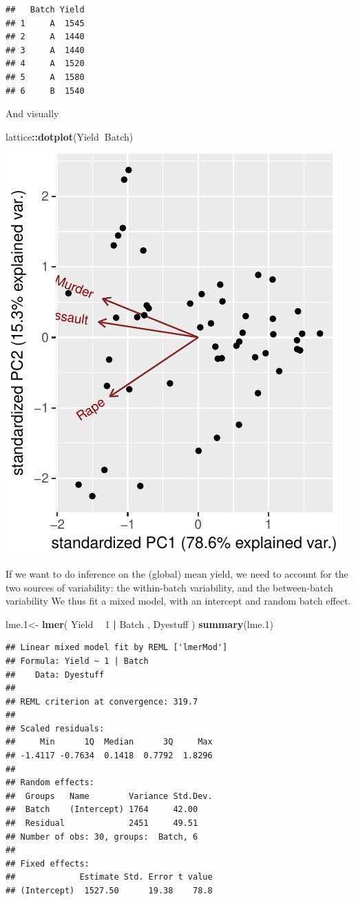 \documentclass[]{book}
\newenvironment{Shaded}{\begin{snugshade}}{\end{snugshade}}
\newcommand{\KeywordTok}[1]{\textcolor[rgb]{0.13,0.29,0.53}{\textbf{#1}}}
\newcommand{\DecValTok}[1]{\textcolor[rgb]{0.00,0.00,0.81}{#1}}
\newcommand{\StringTok}[1]{\textcolor[rgb]{0.31,0.60,0.02}{#1}}
\newcommand{\OperatorTok}[1]{\textcolor[rgb]{0.81,0.36,0.00}{\textbf{#1}}}
\newcommand{\NormalTok}[1]{#1}
\theoremstyle{definition}
\theoremstyle{definition}
\theoremstyle{definition}
\theoremstyle{remark}
\begin{document}
\begin{verbatim}
##   Batch Yield
## 1     A  1545
## 2     A  1440
## 3     A  1440
## 4     A  1520
## 5     A  1580
## 6     B  1540
\end{verbatim}

And visually

\begin{Shaded}
\begin{Highlighting}[]
\NormalTok{lattice}\OperatorTok{::}\KeywordTok{dotplot}\NormalTok{(Yield}\OperatorTok{~}\NormalTok{Batch)}
\end{Highlighting}
\end{Shaded}

\includegraphics[width=0.5\linewidth]{Rcourse_files/figure-latex/unnamed-chunk-199-1}

If we want to do inference on the (global) mean yield, we need to
account for the two sources of variability: the within-batch
variability, and the between-batch variability We thus fit a mixed
model, with an intercept and random batch effect.

\begin{Shaded}
\begin{Highlighting}[]
\NormalTok{lme.}\DecValTok{1}\NormalTok{<-}\StringTok{ }\KeywordTok{lmer}\NormalTok{( Yield }\OperatorTok{~}\StringTok{ }\DecValTok{1}  \OperatorTok{|}\StringTok{ }\NormalTok{Batch  , Dyestuff )}
\KeywordTok{summary}\NormalTok{(lme.}\DecValTok{1}\NormalTok{)}
\end{Highlighting}
\end{Shaded}

\begin{verbatim}
## Linear mixed model fit by REML ['lmerMod']
## Formula: Yield ~ 1 | Batch
##    Data: Dyestuff
## 
## REML criterion at convergence: 319.7
## 
## Scaled residuals: 
##     Min      1Q  Median      3Q     Max 
## -1.4117 -0.7634  0.1418  0.7792  1.8296 
## 
## Random effects:
##  Groups   Name        Variance Std.Dev.
##  Batch    (Intercept) 1764     42.00   
##  Residual             2451     49.51   
## Number of obs: 30, groups:  Batch, 6
## 
## Fixed effects:
##             Estimate Std. Error t value
## (Intercept)  1527.50      19.38    78.8
\end{verbatim}
\end{document}
